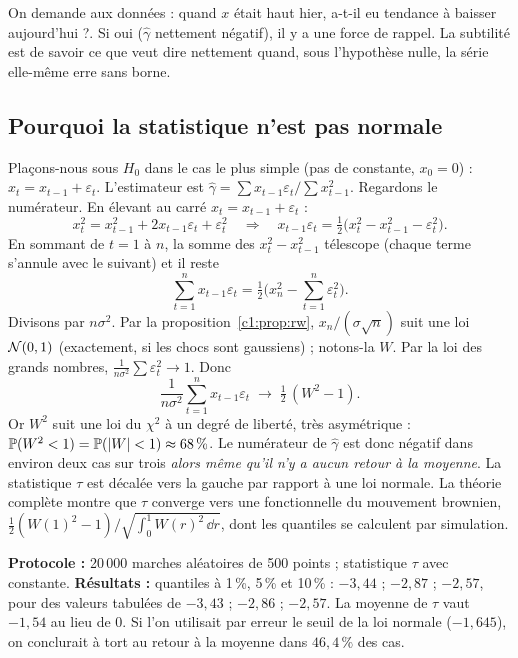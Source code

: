 \begin{intuition}
On demande aux données : \og quand $x$ était haut hier, a-t-il eu tendance à baisser aujourd'hui ?\fg. Si oui ($\hat\gamma$ nettement négatif), il y a une force de rappel. La subtilité est de savoir ce que veut dire \og nettement\fg{} quand, sous l'hypothèse nulle, la série elle-même erre sans borne.
\end{intuition}

\subsection{Pourquoi la statistique n'est pas normale}

Plaçons-nous sous $H_0$ dans le cas le plus simple (pas de constante, $x_0 = 0$) : $x_t = x_{t-1}+\varepsilon_t$. L'estimateur est $\hat\gamma = \sum x_{t-1}\varepsilon_t/\sum x_{t-1}^2$. Regardons le numérateur. En élevant au carré $x_t = x_{t-1}+\varepsilon_t$ :
\[
x_t^2 = x_{t-1}^2 + 2x_{t-1}\varepsilon_t + \varepsilon_t^2 \quad\Longrightarrow\quad x_{t-1}\varepsilon_t = \tfrac12\big(x_t^2 - x_{t-1}^2 - \varepsilon_t^2\big).
\]
En sommant de $t = 1$ à $n$, la somme des $x_t^2 - x_{t-1}^2$ \og télescope\fg{} (chaque terme s'annule avec le suivant) et il reste
\[
\sum_{t=1}^n x_{t-1}\varepsilon_t = \tfrac12\Big(x_n^2 - \sum_{t=1}^n\varepsilon_t^2\Big).
\]
Divisons par $n\sigma^2$. Par la proposition~\ref{c1:prop:rw}, $x_n/(\sigma\sqrt n)$ suit une loi $\mathcal{N}(0,1)$ (exactement, si les chocs sont gaussiens) ; notons-la $W$. Par la loi des grands nombres, $\frac1{n\sigma^2}\sum\varepsilon_t^2 \to 1$. Donc
\[
\frac{1}{n\sigma^2}\sum_{t=1}^n x_{t-1}\varepsilon_t \;\longrightarrow\; \tfrac12\,(W^2 - 1).
\]
Or $W^2$ suit une loi du $\chi^2$ à un degré de liberté, très asymétrique : $\mathbb{P}(W^2 < 1) = \mathbb{P}(|W|<1) \approx 68\,\%$. Le numérateur de $\hat\gamma$ est donc négatif dans environ deux cas sur trois \emph{alors même qu'il n'y a aucun retour à la moyenne}. La statistique $\tau$ est décalée vers la gauche par rapport à une loi normale. La théorie complète \citep{dickeyfuller1979,hamilton1994} montre que $\tau$ converge vers une fonctionnelle du mouvement brownien, $\tfrac12(W(1)^2-1)/\sqrt{\int_0^1 W(r)^2\,\dd r}$, dont les quantiles se calculent par simulation.

\begin{codebox}
\textbf{Protocole :} 20\,000 marches aléatoires de 500 points ; statistique $\tau$ avec constante. \textbf{Résultats :} quantiles à 1\,\%, 5\,\% et 10\,\% : $-3{,}44$ ; $-2{,}87$ ; $-2{,}57$, pour des valeurs tabulées de $-3{,}43$ ; $-2{,}86$ ; $-2{,}57$. La moyenne de $\tau$ vaut $-1{,}54$ au lieu de 0. Si l'on utilisait par erreur le seuil de la loi normale ($-1{,}645$), on conclurait à tort au retour à la moyenne dans $46{,}4\,\%$ des cas.
\end{codebox}

